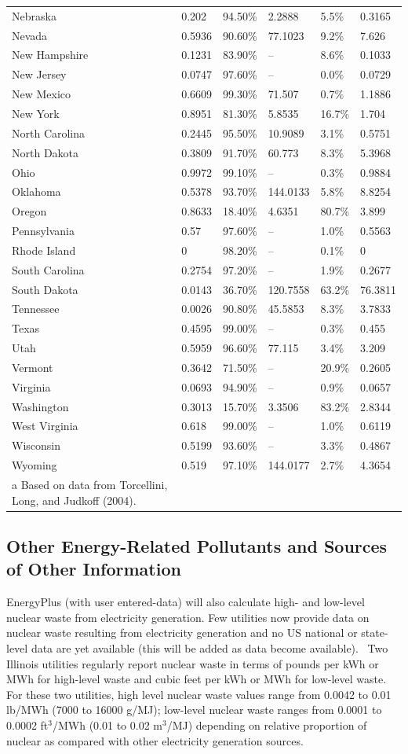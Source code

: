 \begin{longtable}[c]{p{1.0in}p{1.0in}p{1.0in}p{1.0in}p{1.0in}p{1.0in}}
Nebraska & 0.202 & 94.50\% & 2.2888 & 5.5\% & 0.3165 \tabularnewline
Nevada & 0.5936 & 90.60\% & 77.1023 & 9.2\% & 7.626 \tabularnewline
New Hampshire & 0.1231 & 83.90\% & -- & 8.6\% & 0.1033 \tabularnewline
New Jersey & 0.0747 & 97.60\% & -- & 0.0\% & 0.0729 \tabularnewline
New Mexico & 0.6609 & 99.30\% & 71.507 & 0.7\% & 1.1886 \tabularnewline
New York & 0.8951 & 81.30\% & 5.8535 & 16.7\% & 1.704 \tabularnewline
North Carolina & 0.2445 & 95.50\% & 10.9089 & 3.1\% & 0.5751 \tabularnewline
North Dakota & 0.3809 & 91.70\% & 60.773 & 8.3\% & 5.3968 \tabularnewline
Ohio & 0.9972 & 99.10\% & -- & 0.3\% & 0.9884 \tabularnewline
Oklahoma & 0.5378 & 93.70\% & 144.0133 & 5.8\% & 8.8254 \tabularnewline
Oregon & 0.8633 & 18.40\% & 4.6351 & 80.7\% & 3.899 \tabularnewline
Pennsylvania & 0.57 & 97.60\% & -- & 1.0\% & 0.5563 \tabularnewline
Rhode Island & 0 & 98.20\% & -- & 0.1\% & 0 \tabularnewline
South Carolina & 0.2754 & 97.20\% & -- & 1.9\% & 0.2677 \tabularnewline
South Dakota & 0.0143 & 36.70\% & 120.7558 & 63.2\% & 76.3811 \tabularnewline
Tennessee & 0.0026 & 90.80\% & 45.5853 & 8.3\% & 3.7833 \tabularnewline
Texas & 0.4595 & 99.00\% & -- & 0.3\% & 0.455 \tabularnewline
Utah & 0.5959 & 96.60\% & 77.115 & 3.4\% & 3.209 \tabularnewline
Vermont & 0.3642 & 71.50\% & -- & 20.9\% & 0.2605 \tabularnewline
Virginia & 0.0693 & 94.90\% & -- & 0.9\% & 0.0657 \tabularnewline
Washington & 0.3013 & 15.70\% & 3.3506 & 83.2\% & 2.8344 \tabularnewline
West Virginia & 0.618 & 99.00\% & -- & 1.0\% & 0.6119 \tabularnewline
Wisconsin & 0.5199 & 93.60\% & -- & 3.3\% & 0.4867 \tabularnewline
Wyoming & 0.519 & 97.10\% & 144.0177 & 2.7\% & 4.3654 \tabularnewline
a Based on data from Torcellini, Long, and Judkoff (2004). \tabularnewline
\bottomrule
\end{longtable}

\subsection{Other Energy-Related Pollutants and Sources of Other Information}\label{other-energy-related-pollutants-and-sources-of-other-information}

EnergyPlus (with user entered-data) will also calculate high- and low-level nuclear waste from electricity generation. Few utilities now provide data on nuclear waste resulting from electricity generation and no US national or state-level data are yet available (this will be added as data become available).~ Two Illinois utilities regularly report nuclear waste in terms of pounds per kWh or MWh for high-level waste and cubic feet per kWh or MWh for low-level waste.~ For these two utilities, high level nuclear waste values range from 0.0042 to 0.01 lb/MWh (7000 to 16000 g/MJ); low-level nuclear waste ranges from 0.0001 to 0.0002 ft\(^{3}\)/MWh (0.01 to 0.02 m\(^{3}\)/MJ) depending on relative proportion of nuclear as compared with other electricity generation sources.

